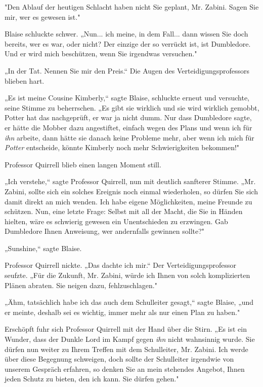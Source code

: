{"Den Ablauf der heutigen Schlacht haben nicht Sie geplant, Mr. Zabini. Sagen Sie mir, wer es gewesen ist."

Blaise schluckte schwer. „Nun... ich meine, in dem Fall... dann wissen Sie doch bereits, wer es war, oder nicht? Der einzige der so verrückt ist, ist Dumbledore. Und er wird mich beschützen, wenn Sie irgendwas versuchen."

„In der Tat. Nennen Sie mir den Preis.“ Die Augen des Verteidigungsprofessors blieben hart.

„Es ist meine Cousine Kimberly,“ sagte Blaise, schluckte erneut und versuchte, seine Stimme zu beherrschen. „Es gibt sie wirklich und sie wird wirklich gemobbt, Potter hat das nachgeprüft, er war ja nicht dumm. Nur dass Dumbledore sagte, er hätte die Mobber dazu angestiftet, einfach wegen des Plans und wenn ich für \emph{ihn} arbeite, dann hätte sie danach keine Probleme mehr, aber wenn ich mich für \emph{Potter} entscheide, könnte Kimberly noch mehr Schwierigkeiten bekommen!"

Professor Quirrell blieb einen langen Moment still.

„Ich verstehe,“ sagte Professor Quirrell, nun mit deutlich sanfterer Stimme. „Mr. Zabini, sollte sich ein solches Ereignis noch einmal wiederholen, so dürfen Sie sich damit direkt an mich wenden. Ich habe eigene Möglichkeiten, meine Freunde zu schützen. Nun, eine letzte Frage: Selbst mit all der Macht, die Sie in Händen hielten, wäre es schwierig gewesen ein Unentschieden zu erzwingen. Gab Dumbledore Ihnen Anweisung, wer andernfalls gewinnen sollte?"

„Sunshine,“ sagte Blaise.

Professor Quirrell nickte. „Das dachte ich mir.“ Der Verteidigungsprofessor seufzte. „Für die Zukunft, Mr. Zabini, würde ich Ihnen von solch komplizierten Plänen abraten. Sie neigen dazu, fehlzuschlagen."

„Ähm, tatsächlich habe ich das auch dem Schulleiter gesagt,“ sagte Blaise, „und er meinte, deshalb sei es wichtig, immer mehr als nur einen Plan zu haben."

Erschöpft fuhr sich Professor Quirrell mit der Hand über die Stirn. „Es ist ein Wunder, dass der Dunkle Lord im Kampf gegen \emph{ihn} nicht wahnsinnig wurde. Sie dürfen nun weiter zu Ihrem Treffen mit dem Schulleiter, Mr. Zabini. Ich werde über diese Begegnung schweigen, doch sollte der Schulleiter irgendwie von unserem Gespräch erfahren, so denken Sie an mein stehendes Angebot, Ihnen jeden Schutz zu bieten, den ich kann. Sie dürfen gehen."

}
